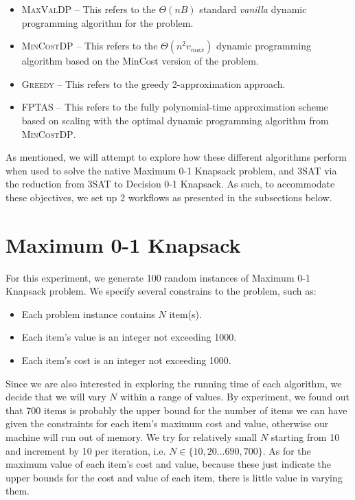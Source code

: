 \documentclass[12pt, oneside]{book}
\providecommand{\tightlist}{%
  \setlength{\itemsep}{0pt}\setlength{\parskip}{0pt}}
\begin{document}
\begin{itemize}
\tightlist
\item
  \textsc{MaxValDP} -- This refers to the \emph{\(\Theta(nB)\)} standard
  \emph{vanilla} dynamic programming algorithm for the problem.
\item
  \textsc{MinCostDP} -- This refers to the \emph{\(\Theta(n^2v_{max})\)}
  dynamic programming algorithm based on the MinCost version of the
  problem.
\item
  \textsc{Greedy} -- This refers to the greedy 2-approximation approach.
\item
  \textsc{FPTAS} -- This refers to the fully polynomial-time
  approximation scheme based on scaling with the optimal dynamic
  programming algorithm from \textsc{MinCostDP}.
\end{itemize}

As mentioned, we will attempt to explore how these different algorithms
perform when used to solve the native Maximum 0-1 Knapsack problem, and
3SAT via the reduction from 3SAT to Decision 0-1 Knapsack. As such, to
accommodate these objectives, we set up 2 workflows as presented in the
subsections below.

\section{Maximum 0-1 Knapsack}\label{maximum-0-1-knapsack}

For this experiment, we generate 100 random instances of Maximum 0-1
Knapsack problem. We specify several constrains to the problem, such as:

\begin{itemize}
\tightlist
\item
  Each problem instance contains \(N\) item(s).
\item
  Each item's value is an integer not exceeding 1000.
\item
  Each item's cost is an integer not exceeding 1000.
\end{itemize}

Since we are also interested in exploring the running time of each
algorithm, we decide that we will vary \(N\) within a range of values.
By experiment, we found out that 700 items is probably the upper bound
for the number of items we can have given the constraints for each
item's maximum cost and value, otherwise our machine will run out of
memory. We try for relatively small \(N\) starting from 10 and increment
by 10 per iteration, i.e. \(N \in \{10, 20 \ldots 690, 700\}\). As for
the maximum value of each item's cost and value, because these just
indicate the upper bounds for the cost and value of each item, there is
little value in varying them.
\end{document}
